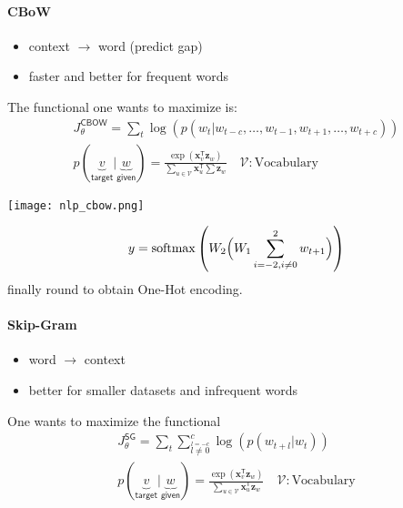 \paragraph{CBoW}
\begin{itemize}
    \item context $\to$ word (predict gap)
    \item faster and better for frequent words
\end{itemize}

The functional one wants to maximize is:
\noindent\begin{gather*}
    J_\theta^{\mathsf{CBOW}}                                               = \sum_{t}\log\left(p(w_t|w_{t-c},\ldots, w_{t-1},w_{t+1},\ldots, w_{t+c})\right)                                   \\
    p(\underbrace{v}_{\textsf{target}} | \underbrace{w}_{\textsf{given}})  = \frac{\exp(\mathbf{x}_v^{\mathsf{T}}\mathbf{z}_w)}{\sum\limits_{u\in \mathcal{V}} \mathbf{x}_u^{\mathsf{T}}\sum\mathbf{z}_w} \quad \mathcal{V}: \text{Vocabulary}
\end{gather*}

\newpar{}
\begin{center}
    \texttt{[image: nlp\_cbow.png]}
\end{center}
\noindent\begin{equation*}
    y = \mathrm{softmax} \left(W_2\Bigl(W_1 \sum_{i=-2, i\neq 0}^{2} w_{t+1}\Bigr)\right)
\end{equation*}
finally round to obtain One-Hot encoding.

\paragraph{Skip-Gram}
\begin{itemize}
    \item word $\to$ context
    \item better for smaller datasets and infrequent words
\end{itemize}

One wants to maximize the functional
\noindent\begin{gather*}
    J_{\theta}^{\mathsf{SG}} = \sum_{t}\sum_{\overset{l=-c}{l\neq 0}}^{c} \log(p(w_{t+l}|w_t))\\
    p(\underbrace{v}_{\textsf{target}} | \underbrace{w}_{\textsf{given}})  = \frac{\exp(\mathbf{x}_v^{\mathsf{T}}\mathbf{z}_w)}{\sum\limits_{u\in \mathcal{V}} \mathbf{x}_u^{\mathsf{T}}\mathbf{z}_w} \quad \mathcal{V}: \text{Vocabulary}
\end{gather*}

